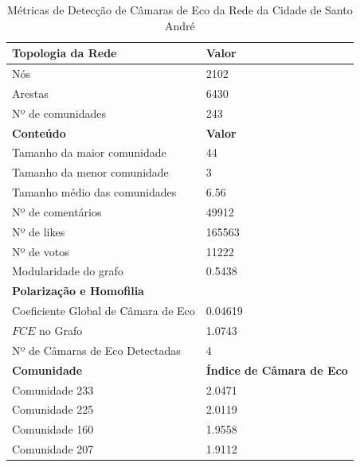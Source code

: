 \begin{table}[ht]
	\centering
	\caption{Métricas de Detecção de Câmaras de Eco da Rede da Cidade de Santo André}
	\label{tab:echo-chamber-metrics-santo-andre}
	\begin{tabular}{l|l}
		\toprule
		\textbf{Topologia da Rede}          & \textbf{Valor}                   \\
		\midrule
		Nós                                 & 2102                             \\
		Arestas                             & 6430                             \\
		Nº de comunidades                   & 243                              \\
		\toprule
		\textbf{Conteúdo}                   & \textbf{Valor}                   \\
		\midrule
		Tamanho da maior comunidade         & 44                               \\
		Tamanho da menor comunidade         & 3                                \\
		Tamanho médio das comunidades       & 6.56                             \\
		Nº de comentários                   & 49912                            \\
		Nº de likes                         & 165563                           \\
		Nº de votos                         & 11222                            \\
		Modularidade do grafo               & 0.5438                           \\
		\midrule
		\textbf{Polarização e Homofilia}    &                                  \\
		\midrule
		Coeficiente Global de Câmara de Eco & 0.04619                          \\
		$FCE$ no Grafo                      & 1.0743                           \\
		Nº de Câmaras de Eco Detectadas     & 4                                \\
		\midrule
		\textbf{Comunidade}                 & \textbf{Índice de Câmara de Eco} \\
		\midrule
		Comunidade 233                      & 2.0471                           \\
		Comunidade 225                      & 2.0119                           \\
		Comunidade 160                      & 1.9558                           \\
		Comunidade 207                      & 1.9112                           \\
		\bottomrule
	\end{tabular}
\end{table}

